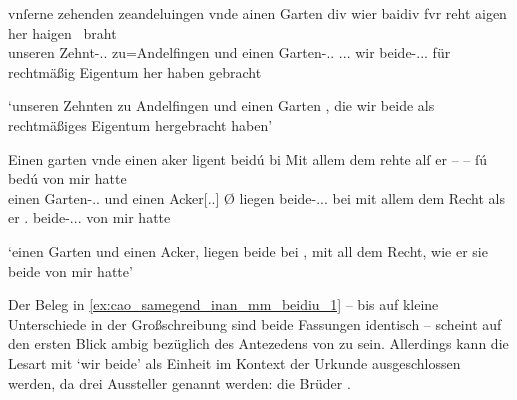 \begin{exe}
\ex \label{ex:cao_samegend_inan_mm_beidiu}
	\begin{xlist}
	\ex \label{ex:cao_samegend_inan_mm_beidiu_1}
		\gll vnſerne zehenden zeandeluingen vnde ainen Garten
				\textelp{} div wier baidiv fvr reht aigen her
				haigen~ braht \\
			unseren Zehnt-\Acc.\Sg{}.\MascI{} zu=Andelfingen und einen
				Garten-\Acc.\Sg.\MascI{} {} \Rel.\Acc.\Pl.\NeutI{} wir
				beide-\Acc.\Pl{}.\NeutI.\St{} für rechtmäßig Eigentum her haben
				gebracht \\
		\begin{taggedline}{\parencites(Kl.~Heiligkreuztal, Kr.~Biberach, 1290)[\pno~1201~AB, 472.10--18]{cao2}}
		\trans `unseren Zehnten zu Andelfingen und einen Garten \textelp{},
			die wir beide als recht\-mäßiges Eigentum hergebracht haben'
		\end{taggedline}

	\ex \label{ex:cao_samegend_inan_mm_beidiu_2}
		\gll Einen garten vnde einen aker {}
				ligent beidú bi \textelp{} Mit allem dem rehte alſ er
				{-- --} ſú bedú von mir hatte \\
			einen Garten-\Acc.\Sg.\MascI{} und einen Acker[\Acc.\Sg.\MascI]
				Ø liegen beide-\Nom.\Pl.\NeutI.\St{} bei {} mit allem dem
				Recht als er {} \Tpl.\Acc{} beide-\Acc.\Pl.\NeutI.\St{} von mir
				hatte \\
		\begin{taggedline}{\parencites(Freiburg i.\,Br., 1299)[\pno~3249, 417.4--6]{cao4}}
		\trans `einen Garten und einen Acker,  liegen beide
			bei \textelp{}, mit all dem Recht, wie er sie beide von mir hatte'
		\end{taggedline}
	\end{xlist}
\end{exe}

Der Beleg in \cref{ex:cao_samegend_inan_mm_beidiu_1} -- bis auf kleine
Unterschiede in der Großschreibung sind beide Fassungen identisch -- scheint
auf den ersten Blick ambig bezüglich des Antezedens von  zu sein.
Allerdings kann die Lesart mit  `wir beide' als Einheit
im Kontext der Urkunde ausgeschlossen werden, da drei Aussteller genannt
werden: die Brüder 
\autocite[\pno~1201~AB, 472.7]{cao2}.

